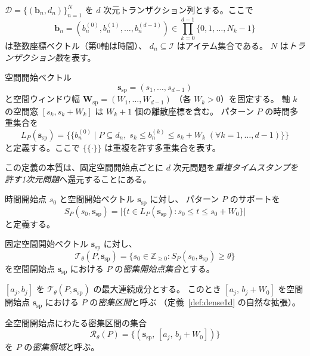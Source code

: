 $\mathcal{D} = \{(\bm{b}_n, d_n)\}_{n=1}^N$ を
$d$ 次元トランザクション列とする。ここで
\[
  \bm{b}_n = (b_n^{(0)}, b_n^{(1)}, \ldots, b_n^{(d-1)})
  \in \prod_{k=0}^{d-1}\{0,1,\ldots,N_k-1\}
\]
は整数座標ベクトル（第0軸は時間）、
$d_n \subseteq \mathcal{I}$ はアイテム集合である。
$N$ は\emph{トランザクション数}を表す。

\begin{definition}[固定空間開始点への時間多重集合還元]\label{def:collapsed_multiset_nd}
空間開始ベクトル
\[
  \bm{s}_{\mathrm{sp}} = (s_1, \ldots, s_{d-1})
\]
と空間ウィンドウ幅
$\bm{W}_{\mathrm{sp}} = (W_1, \ldots, W_{d-1})$
（各 $W_k > 0$）を固定する。
軸 $k$ の空間窓 $[s_k, s_k + W_k]$ は $W_k + 1$ 個の離散座標を含む。
パターン $P$ の時間多重集合を
\[
  L_P(\bm{s}_{\mathrm{sp}})
  =
  \{\!\{
    b_n^{(0)}
    \mid
    P \subseteq d_n,\;
    s_k \leq b_n^{(k)} \leq s_k + W_k\; (\forall k=1,\ldots,d-1)
  \}\!\}
\]
と定義する。ここで $\{\!\{\cdot\}\!\}$ は重複を許す多重集合を表す。
\end{definition}

この定義の本質は、固定空間開始点ごとに
$d$ 次元問題を\emph{重複タイムスタンプを許す1次元問題}へ還元することにある。

\begin{definition}[$d$ 次元スライディングウィンドウサポート]\label{def:support_nd}
時間開始点 $s_0$ と空間開始ベクトル $\bm{s}_{\mathrm{sp}}$ に対し、
パターン $P$ のサポートを
\begin{equation}\label{eq:support_nd}
  S_P(s_0, \bm{s}_{\mathrm{sp}})
  = \bigl|\{t \in L_P(\bm{s}_{\mathrm{sp}}) : s_0 \leq t \leq s_0 + W_0\}\bigr|
\end{equation}
と定義する。
\end{definition}

\begin{definition}[密集開始点集合と密集領域]\label{def:dense_region_nd}
固定空間開始ベクトル $\bm{s}_{\mathrm{sp}}$ に対し、
\[
  \mathcal{T}_\theta(P,\bm{s}_{\mathrm{sp}})
  =
  \{s_0 \in \mathbb{Z}_{\geq 0} : S_P(s_0,\bm{s}_{\mathrm{sp}}) \geq \theta\}
\]
を空間開始点 $\bm{s}_{\mathrm{sp}}$ における $P$ の\emph{密集開始点集合}とする。

$[a_j,b_j]$ を $\mathcal{T}_\theta(P,\bm{s}_{\mathrm{sp}})$ の最大連続成分とする。
このとき $[a_j,\, b_j + W_0]$ を空間開始点 $\bm{s}_{\mathrm{sp}}$ における
$P$ の\emph{密集区間}と呼ぶ
（定義~\ref{def:dense1d} の自然な拡張）。

全空間開始点にわたる密集区間の集合
\[
  \mathcal{R}_\theta(P)
  = \{(\bm{s}_{\mathrm{sp}},\, [a_j,\, b_j + W_0])\}
\]
を $P$ の\emph{密集領域}と呼ぶ。
\end{definition}

